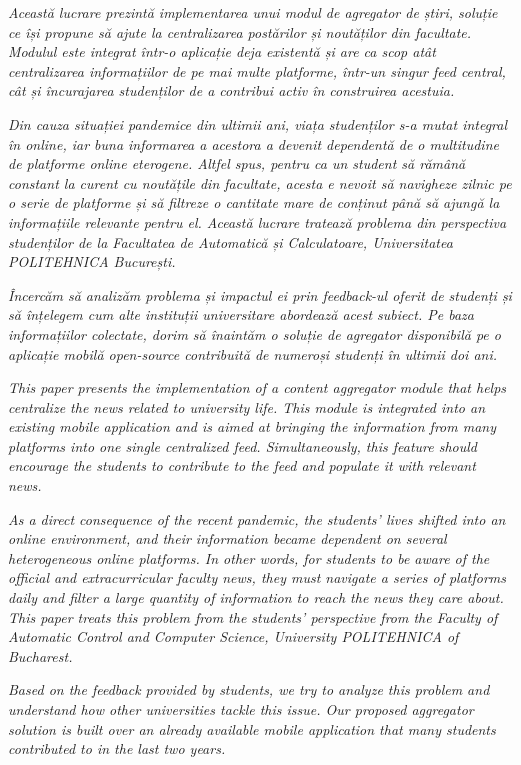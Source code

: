 \noindent

\textit{Această lucrare prezintă implementarea unui modul de agregator de știri, soluție ce își propune să ajute la centralizarea postărilor și noutăților din facultate. Modulul este integrat într-o aplicație deja existentă și are ca scop atât centralizarea informațiilor de pe mai multe platforme, într-un singur feed central, cât și încurajarea studenților de a contribui activ în construirea acestuia.}

\textit{Din cauza situației pandemice din ultimii ani, viața studenților s-a mutat integral în online, iar buna informarea a acestora a devenit dependentă de o multitudine de platforme online eterogene. Altfel spus, pentru ca un student să rămână constant la curent cu noutățile din facultate, acesta e nevoit să navigheze zilnic pe o serie de platforme și să filtreze o cantitate mare de conținut până să ajungă la informațiile relevante pentru el. Această lucrare tratează problema din perspectiva studenților de la Facultatea de Automatică și Calculatoare, Universitatea POLITEHNICA București.}

\textit{Încercăm să analizăm problema și impactul ei prin feedback-ul oferit de studenți și să înțelegem cum alte instituții universitare abordează acest subiect. Pe baza informațiilor colectate, dorim să înaintăm o soluție de agregator disponibilă pe o aplicație mobilă open-source contribuită de numeroși studenți în ultimii doi ani. }

\vspace*{2\baselineskip}

\textit{This paper presents the implementation of a content aggregator module that helps centralize the news related to university life. This module is integrated into an existing mobile application and is aimed at bringing the information from many platforms into one single centralized feed. Simultaneously, this feature should encourage the students to contribute to the feed and populate it with relevant news.}

\textit{As a direct consequence of the recent pandemic, the students' lives shifted into an online environment, and their information became dependent on several heterogeneous online platforms. In other words, for students to be aware of the official and extracurricular faculty news, they must navigate a series of platforms daily and filter a large quantity of information to reach the news they care about. This paper treats this problem from the students' perspective from the Faculty of Automatic Control and Computer Science, University POLITEHNICA of Bucharest.}

\textit{Based on the feedback provided by students, we try to analyze this problem and understand how other universities tackle this issue. Our proposed aggregator solution is built over an already available mobile application that many students contributed to in the last two years.}

\vspace*{\fill}
